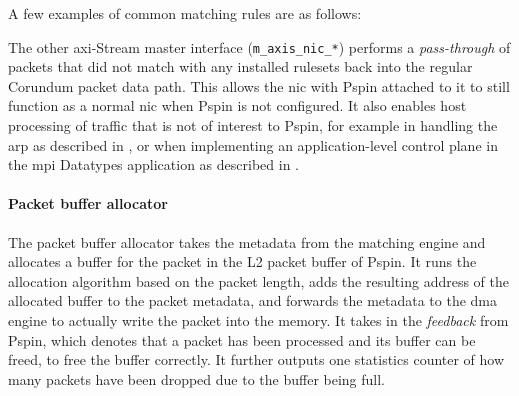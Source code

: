 A few examples of common matching rules are as follows:

The other \ac{axi}-Stream master interface (\texttt{m\_\-axis\_\-nic\_\-*}) performs a \emph{pass-through} of packets that did not match with any installed rulesets back into the regular Corundum packet data path.  This allows the \ac{nic} with P\acs{spin} attached to it to still function as a normal \ac{nic} when P\acs{spin} is not configured.  It also enables host processing of traffic that is not of interest to P\acs{spin}, for example in handling the \ac{arp} as described in , or when implementing an application-level control plane in the \ac{mpi} Datatypes application as described in .

\paragraph{Packet buffer allocator} The packet buffer allocator takes the metadata from the matching engine and allocates a buffer for the packet in the L2 packet buffer of P\acs{spin}.  It runs the allocation algorithm based on the packet length, adds the resulting address of the allocated buffer to the packet metadata, and forwards the metadata to the \ac{dma} engine to actually write the packet into the memory.  It takes in the \emph{feedback} from P\acs{spin}, which denotes that a packet has been processed and its buffer can be freed, to free the buffer correctly.  It further outputs one statistics counter of how many packets have been dropped due to the buffer being full.

